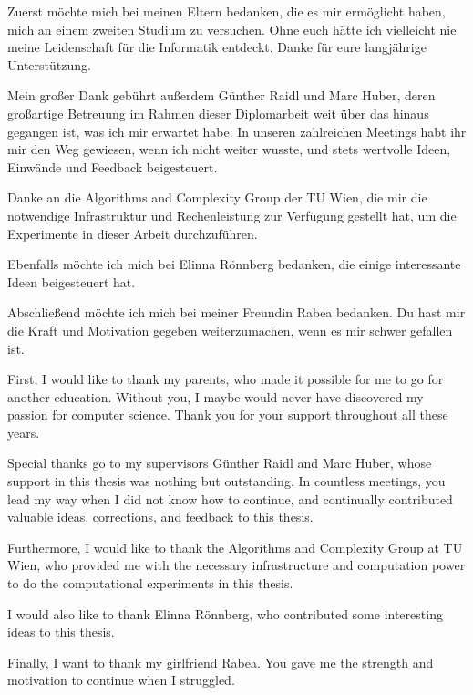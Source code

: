 \documentclass[draft,final]{vutinfth} %
\begin{document}
\frontmatter %

\addstatementpage

\begin{danksagung*}

Zuerst möchte mich bei meinen Eltern bedanken, die es mir ermöglicht haben, mich an einem zweiten Studium zu versuchen. 
Ohne euch hätte ich vielleicht nie meine Leidenschaft für die Informatik entdeckt. Danke für eure langjährige Unterstützung. 

Mein großer Dank gebührt außerdem Günther Raidl und Marc Huber, deren großartige Betreuung im Rahmen dieser Diplomarbeit weit über das hinaus gegangen ist, was ich mir erwartet habe. 
In unseren zahlreichen Meetings habt ihr mir den Weg gewiesen, wenn ich nicht weiter wusste, und stets wertvolle Ideen, Einwände und Feedback beigesteuert. 

Danke an die Algorithms and Complexity Group der TU Wien, die mir die notwendige Infrastruktur und Rechenleistung zur Verfügung gestellt hat, um die Experimente in dieser Arbeit durchzuführen. 

Ebenfalls möchte ich mich bei Elinna Rönnberg bedanken, die einige interessante Ideen beigesteuert hat. 

Abschließend möchte ich mich bei meiner Freundin Rabea bedanken. 
Du hast mir die Kraft und Motivation gegeben weiterzumachen, wenn es mir schwer gefallen ist. 

\end{danksagung*}

\begin{acknowledgements*}
First, I would like to thank my parents, who made it possible for me to go for another education. Without you, I maybe would never have discovered my passion for computer science. Thank you for your support throughout all these years. 

Special thanks go to my supervisors Günther Raidl and Marc Huber, whose support in this thesis was nothing but outstanding. 
In countless meetings, you lead my way when I did not know how to continue, and continually contributed valuable ideas, corrections, and feedback to this thesis. 

Furthermore, I would like to thank the Algorithms and Complexity Group at TU Wien, who provided me with the necessary infrastructure and computation power to do the computational experiments in this thesis. 

I would also like to thank Elinna Rönnberg, who contributed some interesting ideas to this thesis. 

Finally, I want to thank my girlfriend Rabea. You gave me the strength and motivation to continue when I struggled. 

\end{acknowledgements*}
\end{document}
